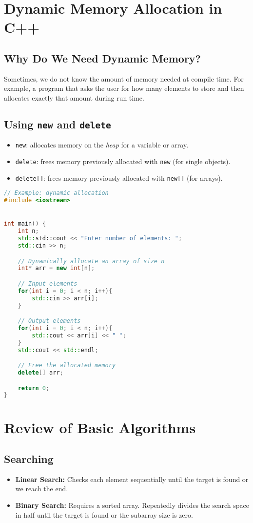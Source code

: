 \documentclass[a4paper,12pt]{article}
\begin{document}
\section{Dynamic Memory Allocation in C++}
\subsection{Why Do We Need Dynamic Memory?}
Sometimes, we do not know the amount of memory needed at compile time. For example, a program that asks the user for how many elements to store and then allocates exactly that amount during run time.

\subsection{Using \texttt{new} and \texttt{delete}}
\begin{itemize}
    \item \texttt{new}: allocates memory on the \emph{heap} for a variable or array.
    \item \texttt{delete}: frees memory previously allocated with \texttt{new} (for single objects).
    \item \texttt{delete[]}: frees memory previously allocated with \texttt{new[]} (for arrays).
\end{itemize}

\begin{lstlisting}[language=C++]
// Example: dynamic allocation
#include <iostream>


int main() {
    int n;
    std::std::cout << "Enter number of elements: ";
    std::cin >> n;

    // Dynamically allocate an array of size n
    int* arr = new int[n];

    // Input elements
    for(int i = 0; i < n; i++){
        std::cin >> arr[i];
    }

    // Output elements
    for(int i = 0; i < n; i++){
        std::cout << arr[i] << " ";
    }
    std::cout << std::endl;

    // Free the allocated memory
    delete[] arr;

    return 0;
}
\end{lstlisting}

\section{Review of Basic Algorithms}
\subsection{Searching}
\begin{itemize}
    \item \textbf{Linear Search:} Checks each element sequentially until the target is found or we reach the end.
    \item \textbf{Binary Search:} Requires a sorted array. Repeatedly divides the search space in half until the target is found or the subarray size is zero.
\end{itemize}
\end{document}
